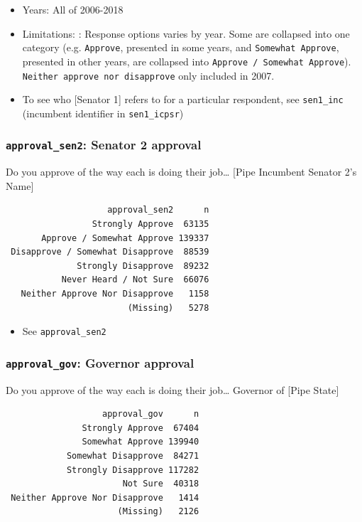 \documentclass[10pt,article,oneside]{memoir}
\theoremstyle{definition}
\begin{document}
\begin{itemize}
\tightlist
\item
  Years: All of 2006-2018
\item
  Limitations: : Response options varies by year. Some are collapsed
  into one category (e.g. \texttt{Approve}, presented in some years, and
  \texttt{Somewhat\ Approve}, presented in other years, are collapsed
  into \texttt{Approve\ /\ Somewhat\ Approve}).
  \texttt{Neither\ approve\ nor\ disapprove} only included in 2007.
\item
  To see who {[}Senator 1{]} refers to for a particular respondent, see
  \texttt{sen1\_inc} (incumbent identifier in \texttt{sen1\_icpsr})
\end{itemize}

\subsubsection{\texorpdfstring{\texttt{approval\_sen2}: Senator 2
approval}{approval\_sen2: Senator 2 approval}}\label{approval_sen2-senator-2-approval}

Do you approve of the way each is doing their job\ldots{} {[}Pipe
Incumbent Senator 2's Name{]}

\begin{verbatim}
                    approval_sen2      n
                 Strongly Approve  63135
       Approve / Somewhat Approve 139337
 Disapprove / Somewhat Disapprove  88539
              Strongly Disapprove  89232
           Never Heard / Not Sure  66076
   Neither Approve Nor Disapprove   1158
                        (Missing)   5278
\end{verbatim}

\begin{itemize}
\tightlist
\item
  See \texttt{approval\_sen2}
\end{itemize}

\subsubsection{\texorpdfstring{\texttt{approval\_gov}: Governor
approval}{approval\_gov: Governor approval}}\label{approval_gov-governor-approval}

Do you approve of the way each is doing their job\ldots{} Governor of
{[}Pipe State{]}

\begin{verbatim}
                   approval_gov      n
               Strongly Approve  67404
               Somewhat Approve 139940
            Somewhat Disapprove  84271
            Strongly Disapprove 117282
                       Not Sure  40318
 Neither Approve Nor Disapprove   1414
                      (Missing)   2126
\end{verbatim}
\end{document}
